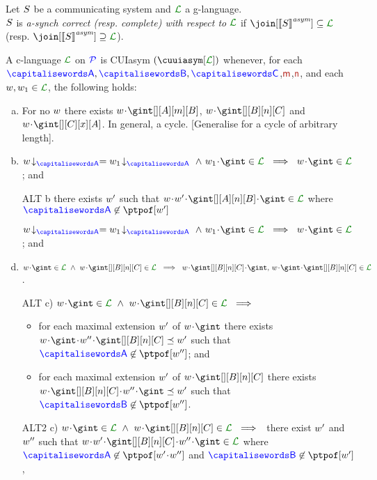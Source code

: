 \begin{definition}\label{def:cc}
  Let $S$ be a communicating system and $\clang$ a g-language.\\
  $S$ is \emph{a-synch correct (resp. complete) with respect to
    $\clang$} if $\join[{\asem{\aCS}}]\subseteq \clang$ (resp. 
  $\join[{\asem{\aCS}}]\supseteq \clang$).
\end{definition}


\begin{definition}[CUIasym]
\label{def:cuiasym}
A c-language $\clang$ on $\mathcal{\color{blue}{P}}$ is CUIasym $(\cuuiasym[\clang])$ whenever,
 for each $\p,\q,\ptp[C]$,$\msg[m]$,$\msg[n]$, and each $\acword, \acword_1\in\clang$, the following holds:
 \begin{enumerate}[a)]
 \item For no $w$ there exists $\acword\cat\gint[][A][m][B]$, $\acword\cat\gint[][B][n][C]$
 and $\acword\cat\gint[][C][x][A]$. In general, a cycle. [Generalise for a cycle of arbitrary length].
  \item
  \label{def:cuiasym-I}
$\proj{\acword}{A} = \proj{\acword_1}{A}\ \land\  \acword_1\cat\gint\in\clang\ \implies\ \acword\cat\gint\in\clang$; and
  \item[ALT b]
\label{def:cuiasym-I}
 there exists $w'$ such that 
  $\acword\cat \acword'\cat\gint[][A][n][B]\cat\gint \in\clang$
  where $\p\not\in\ptpof[\acword']$

$\proj{\acword}{A} = \proj{\acword_1}{A}\ \land\  \acword_1\cat\gint\in\clang\ \implies\ \acword\cat\gint\in\clang$; and
 \item
 $\acword\cat\gint\in\clang\ \land\ \acword\cat\gint[][B][n][C]\in\clang\   \implies\
 \acword\cat\gint[][B][n][C]\cat\gint,\, \acword\cat\gint\cat\gint[][B][n][C]\in\clang$.
 \item[ALT c)]
  $\acword\cat\gint\in\clang\ \land\ \acword\cat\gint[][B][n][C]\in\clang\   \implies\ $
  \begin{itemize}
  \item
  for each maximal extension $w'$ of $\acword\cat\gint$ there exists
  $\acword\cat\gint\cat \acword'' \cat\gint[][B][n][C]\preceq \acword'$
  such that $\p\not\in\ptpof[\acword'']$; and
    \item
  for each maximal extension $w'$ of $\acword\cat\gint[][B][n][C]$ there exists
  $\acword\cat\gint[][B][n][C]\cat \acword'' \cat\gint\preceq \acword'$
  such that $\q\not\in\ptpof[\acword'']$.
  \end{itemize}
   \item[ALT2 c)]
  $\acword\cat\gint\in\clang\ \land\ \acword\cat\gint[][B][n][C]\in\clang\   \implies\ $
  there exist $w'$ and $w''$ such that 
  $\acword\cat \acword'\cat\gint[][B][n][C]\cat\acword''\cat\gint \in\clang$
  where $\p\not\in\ptpof[\acword'\cat\acword'']$ and $\q\not\in\ptpof[\acword']$,
\end{enumerate}
\end{definition}

